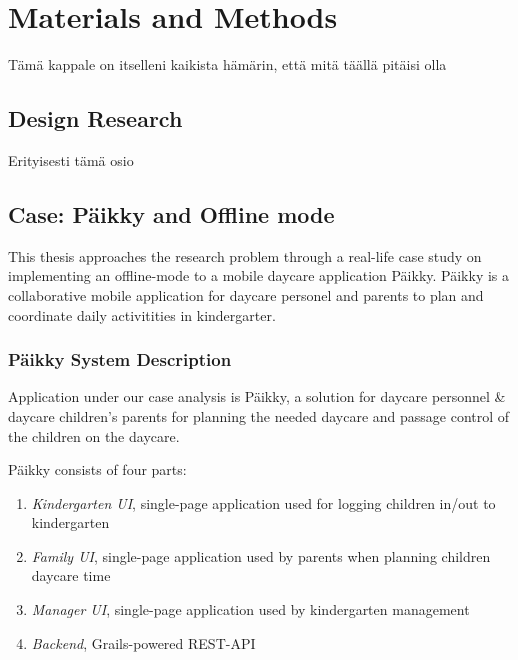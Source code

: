 
\chapter{Materials and Methods}
Tämä kappale on itselleni kaikista hämärin, että mitä täällä pitäisi olla


\section{Design Research}
Erityisesti tämä osio



\section{Case: Päikky and Offline mode}

This thesis approaches the research problem through a real-life case study on implementing an offline-mode to a mobile daycare application Päikky. Päikky is a collaborative mobile application for daycare personel and parents to plan and coordinate daily activitities in kindergarter. 



\subsection{Päikky System Description}
Application under our case analysis is Päikky, a solution for daycare personnel & daycare children’s parents for planning the needed daycare and passage control of the children on the daycare. 

Päikky consists of four parts:

\begin{enumerate}
	\item \textit{Kindergarten UI}, single-page application used for logging children in/out to kindergarten
	\item \textit{Family UI}, single-page application used by parents when planning children daycare time
	\item \textit{Manager UI}, single-page application used by kindergarten management 
	\item \textit{Backend}, Grails-powered REST-API
\end{enumerate}

